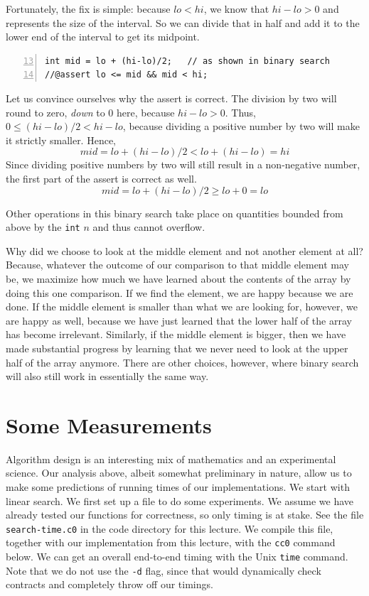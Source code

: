 Fortunately, the fix is simple: because $\mathit{lo} < \mathit{hi}$, we know
that $\mathit{hi} - \mathit{lo} > 0$ and represents the size of the interval.
So we can divide that in half and add it to the lower end of the interval to
get its midpoint.
\begin{lstlisting}[language={[C0]C}, numbers=left, firstnumber=13]
int mid = lo + (hi-lo)/2;   // as shown in binary search
//@assert lo <= mid && mid < hi;
\end{lstlisting}
Let us convince ourselves why the assert is correct.  The division by two will
round to zero, \emph{down} to 0 here, because $\mathit{hi} - \mathit{lo} > 0$.
Thus, \(0 \leq (\mathit{hi}-\mathit{lo})/2 < \mathit{hi}-\mathit{lo}\),
because dividing a positive number by two will make it strictly smaller.
Hence,
$$
\mathit{mid = lo + (hi-lo)}/2 < \mathit{lo + (hi-lo) = hi}
$$
Since dividing positive numbers by two will still result in a non-negative
number, the first part of the assert is correct as well.
$$
\mathit{mid = lo + (hi-lo)}/2 \geq \mathit{lo + 0 = lo}
$$

Other operations in this binary search take place on quantities bounded from
above by the \lstinline'int' $n$ and thus cannot overflow.


Why did we choose to look at the middle element and not another element at
all?  Because, whatever the outcome of our comparison to that middle element
may be, we maximize how much we have learned about the contents of the array
by doing this one comparison. If we find the element, we are happy because we
are done. If the middle element is smaller than what we are looking for,
however, we are happy as well, because we have just learned that the lower
half of the array has become irrelevant. Similarly, if the middle element is
bigger, then we have made substantial progress by learning that we never need
to look at the upper half of the array anymore.  There are other choices,
however, where binary search will also still work in essentially the same way.


\section{Some Measurements}
\label{sec:binsearch:empirical}

Algorithm design is an interesting mix of mathematics and an experimental
science.  Our analysis above, albeit somewhat preliminary in nature, allow us
to make some predictions of running times of our implementations.  We start
with linear search.  We first set up a file to do some experiments.  We assume
we have already tested our functions for correctness, so only timing is at
stake.  See the file \lstinline'search-time.c0' in the code directory for this
lecture.  We compile this file, together with our implementation from this
lecture, with the \lstinline'cc0' command below.  We can get an overall
end-to-end timing with the Unix \lstinline'time' command.  Note that we do not
use the \lstinline'-d' flag, since that would dynamically check contracts and
completely throw off our timings.

